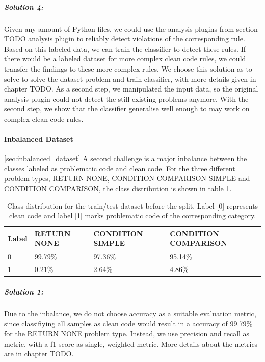 \subparagraph{Solution 4:}
Given any amount of Python files, we could use the analysis plugins from section TODO analysis plugin to reliably detect violations of the corresponding rule. Based on this labeled data, we can train the classifier to detect these rules. If there would be a labeled dataset for more complex clean code rules, we could transfer the findings to these more complex rules. We choose this solution as to solve to solve the dataset problem and train classifier, with more details given in chapter TODO. As a second step, we manipulated the input data, so the original analysis plugin could not detect the still existing problems anymore. With the second step, we show that the classifier generalise well enough to may work on complex clean code rules.

\paragraph{Inbalanced Dataset}\ref{sec:inbalanced_dataset}
A second challenge is a major inbalance between the classes labeled as problematic code and clean code. For the three different problem types, RETURN NONE, CONDITION COMPARISON SIMPLE and CONDITION COMPARISON, the class distribution is shown in table \ref{tab:class_distribution_in_dataset}.



\begin{table}[]
    \begin{tabular}{@{}llll@{}}
    \toprule
    Label  & RETURN NONE & CONDITION SIMPLE & CONDITION COMPARISON \\ \midrule
    0 & 99.79\%     & 97.36\%          & 95.14\%              \\
    1 & 0.21\%      & 2.64\%           & 4.86\%               \\ \bottomrule
    \end{tabular}
    \caption{Class distribution for the train/test dataset before the split. Label [0] represents clean code and label [1] marks problematic code of the corresponding category.}
    \label{tab:class_distribution_in_dataset}
    \end{table}


\subparagraph{Solution 1:}
Due to the inbalance, we do not choose accuracy as a suitable evaluation metric, since classifiying all samples as clean code would result in a accuracy of 99.79\% for the RETURN NONE problem type. Instead, we use precision and recall as metric, with a f1 score as single, weighted metric. More details about the metrics are in chapter TODO.

